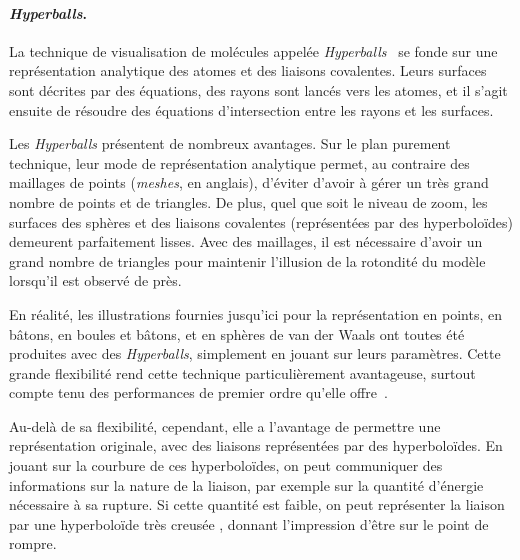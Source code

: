 	\paragraph{\emph{Hyperballs}.} La technique de visualisation de molécules appelée \emph{Hyperballs}~\cite{chavent2011gpu} se fonde sur une représentation analytique des atomes et des liaisons covalentes. Leurs surfaces sont décrites par des équations, des rayons sont lancés vers les atomes, et il s'agit ensuite de résoudre des équations d'intersection entre les rayons et les surfaces.
		
	Les \emph{Hyperballs} présentent de nombreux avantages. Sur le plan purement technique, leur mode de représentation analytique permet, au contraire des maillages de points (\emph{meshes}, en anglais), d'éviter d'avoir à gérer un très grand nombre de points et de triangles. De plus, quel que soit le niveau de zoom, les surfaces des sphères et des liaisons covalentes (représentées par des hyperboloïdes) demeurent parfaitement lisses. %
	Avec des maillages, il est nécessaire d'avoir un grand nombre de triangles pour maintenir l'illusion de la rotondité du modèle lorsqu'il est observé de près.
		
	En réalité, les illustrations fournies jusqu'ici pour la représentation en points, en bâtons, en boules et bâtons, et en sphères de van der Waals ont toutes été produites avec des \emph{Hyperballs}, simplement en jouant sur leurs paramètres. Cette grande flexibilité rend cette technique particulièrement avantageuse, surtout compte tenu des performances de premier ordre qu'elle offre~\cite{chavent2011gpu}.
		
	Au-delà de sa flexibilité, cependant, elle a l'avantage de permettre une représentation originale, avec des liaisons représentées par des hyperboloïdes. En jouant sur la courbure de ces hyperboloïdes, on peut communiquer des informations sur la nature de la liaison, par exemple sur la quantité d'énergie nécessaire à sa rupture. Si cette quantité est faible, on peut représenter la liaison par une hyperboloïde très \og creusée \fg{}, donnant l'impression d'être sur le point de rompre.
		
